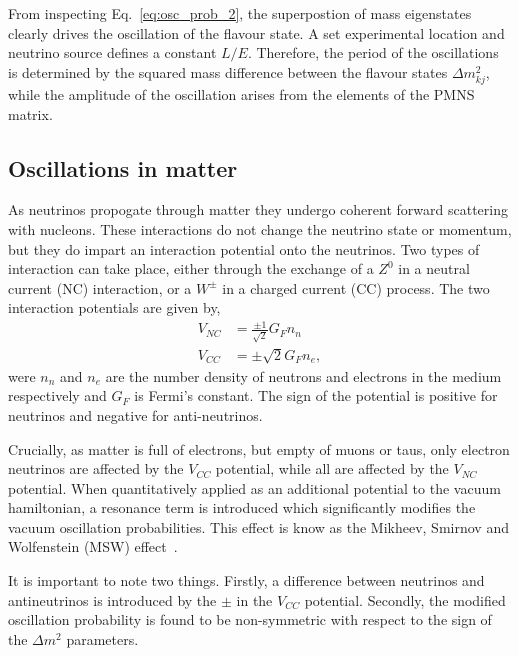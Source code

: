 From inspecting Eq.~\ref{eq:osc_prob_2}, the superpostion of mass eigenstates clearly drives the
oscillation of the flavour state. A set experimental location and neutrino source defines a
constant $L/E$. Therefore, the period of the oscillations is determined by the squared mass
difference between the flavour states $\Delta m_{kj}^{2}$, while the amplitude of the
oscillation arises from the elements of the PMNS matrix.

\subsection{Oscillations in matter}

As neutrinos propogate through matter they undergo coherent forward scattering with nucleons.
These interactions do not change the neutrino state or momentum, but they do impart an interaction
potential onto the neutrinos. Two types of interaction can take place, either through the exchange
of a $Z^{0}$ in a neutral current (NC) interaction, or a $W^{\pm}$ in a charged current (CC)
process. The two interaction potentials are given by,
\begin{align} %
    V_{NC} & = \frac{\pm 1}{\sqrt{2}}G_{F}n_{n} \\
    V_{CC} & = \pm\sqrt{2}G_{F}n_{e},
\end{align} %
were $n_{n}$ and $n_{e}$ are the number density of neutrons and electrons in the medium
respectively and $G_{F}$ is Fermi's constant. The sign of the potential is positive for neutrinos
and negative for anti-neutrinos.

Crucially, as matter is full of electrons, but empty of muons or taus, only electron neutrinos
are affected by the $V_{CC}$ potential, while all are affected by the $V_{NC}$ potential. When
quantitatively applied as an additional potential to the vacuum hamiltonian, a
resonance term is introduced which significantly modifies the vacuum oscillation probabilities.
This effect is know as the Mikheev, Smirnov and Wolfenstein (MSW)
effect~\cite{wolfenstein1978, mikheev1986}.

It is important to note two things. Firstly, a difference between neutrinos and antineutrinos is
introduced by the $\pm$ in the $V_{CC}$ potential. Secondly, the modified oscillation probability
is found to be non-symmetric with respect to the sign of the $\Delta m^{2}$ parameters.

